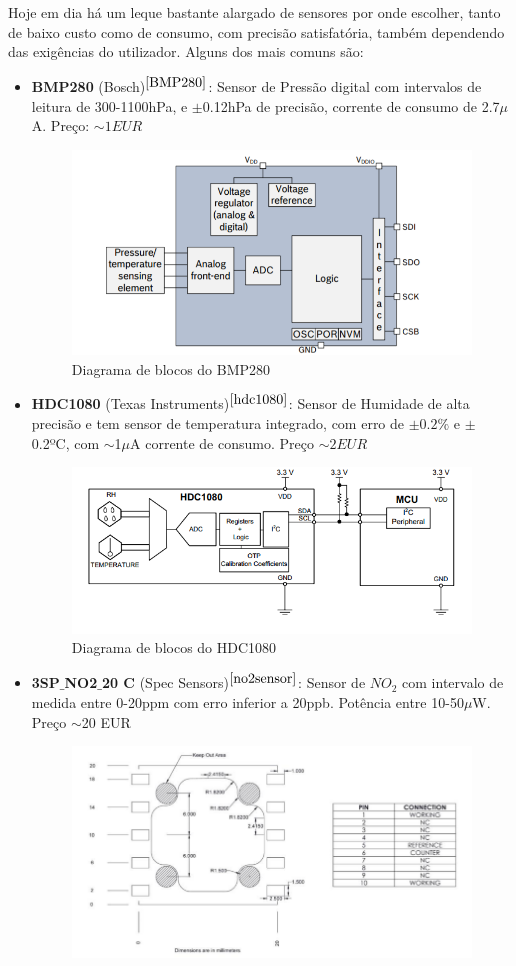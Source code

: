 \documentclass[12pt]{article}
\begin{document}
\par Hoje em dia há um leque bastante alargado de sensores por onde escolher, tanto de baixo custo como de consumo, com precisão satisfatória, também dependendo das exigências do utilizador. Alguns dos mais comuns são:
\begin{itemize}
    \item \textbf{BMP280} (Bosch)$^{\cite{BMP280}}$: Sensor de Pressão digital com intervalos de leitura de 300-1100hPa, e $\pm$0.12hPa de precisão, corrente de consumo de 2.7$\mu$A. Preço: $\sim1 EUR$
    \begin{figure}[H]
        \centering
        \includegraphics[width=0.6\linewidth]{imgs/bmp280.png}
        \caption{Diagrama de blocos do BMP280}
    \end{figure}
    \item \textbf{HDC1080} (Texas Instruments)$^{\cite{hdc1080}}$: Sensor de Humidade de alta precisão e tem sensor de temperatura integrado, com erro de $\pm0.2\%$ e $\pm$0.2ºC, com $\sim$1$\mu$A corrente de consumo. Preço $\sim2 EUR$
    \begin{figure}[H]
        \centering
        \includegraphics[width=0.6\linewidth]{imgs/hdc1080.png}
        \caption{Diagrama de blocos do HDC1080}
    \end{figure}
    \item \textbf{3SP$\_$NO2$\_$20 C} (Spec Sensors)$^{\cite{no2sensor}}$: Sensor de $NO_2$ com intervalo de medida entre 0-20ppm com erro inferior a 20ppb. Potência entre 10-50$\mu$W. Preço $\sim$20 EUR
    \begin{figure}[H]
        \centering
        \includegraphics[width=0.6\linewidth]{imgs/no2.png}

\end{figure}
\end{itemize}
\end{document}
